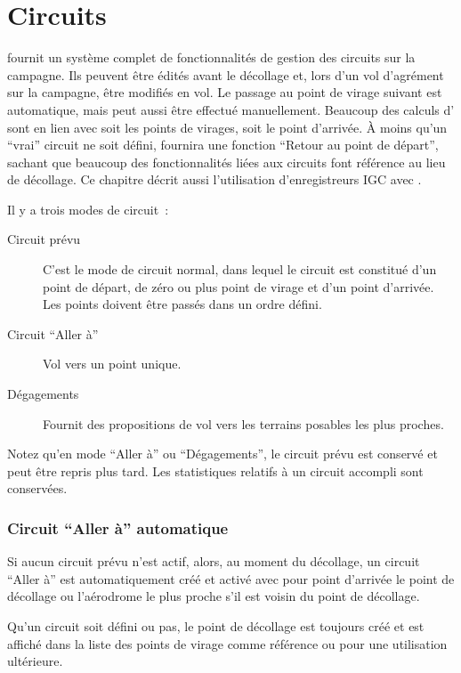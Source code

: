 
\chapter{Circuits}\label{cha:tasks}

\xc{} fournit un système complet de fonctionnalités de gestion des circuits sur la campagne. Ils peuvent être
édités avant le décollage et, lors d'un vol d'agrément
sur la campagne, être modifiés en vol. Le passage au point de virage suivant est automatique,
mais peut aussi être effectué manuellement. Beaucoup des calculs d'\xc{} sont en lien avec
soit les points de virages, soit le point d'arrivée.
À moins qu'un ``vrai'' circuit ne soit défini, \xc{} fournira une fonction ``Retour au point de départ'',
sachant que beaucoup des fonctionnalités liées aux circuits font référence au lieu de décollage.
Ce chapitre décrit aussi l'utilisation d'enregistreurs IGC avec \xc.

Il y a trois modes de circuit~:
\begin{description}
\item[Circuit prévu] C'est le mode de circuit normal,
dans lequel le circuit est constitué d'un point de départ, de zéro ou plus point de virage
et d'un point d'arrivée. Les points doivent être passés dans un ordre défini.
\item[Circuit ``Aller à''] Vol vers un point unique.
\item[Dégagements] Fournit des propositions de vol vers les  terrains posables les plus proches.
\end{description}

Notez qu'en mode ``Aller à'' ou ``Dégagements'', le circuit prévu est conservé et peut être repris plus tard.
Les statistiques relatifs à un circuit accompli sont conservées.

\subsection*{Circuit ``Aller à'' automatique}

Si aucun circuit prévu n'est actif, alors, au moment du décollage, un circuit ``Aller à'' est automatiquement
créé et activé avec pour point d'arrivée le point de décollage ou l'aérodrome le plus proche
s'il est voisin du point de décollage.

Qu'un circuit soit défini ou pas, le point de décollage est toujours
créé et est affiché dans la liste des points de virage comme référence ou pour une utilisation ultérieure.

